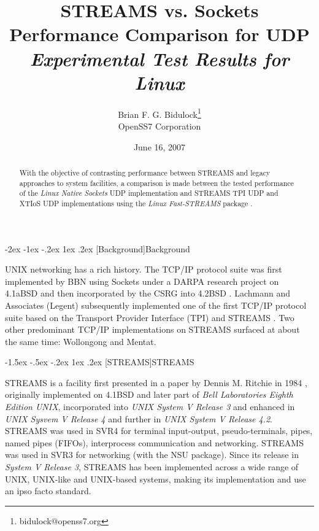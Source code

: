 \documentclass[letterpaper,final,notitlepage,twocolumn,10pt,twoside]{article}
\makeatletter
\renewcommand\section{\@startsection {section}{1}{\z@}%
                                   {-2ex \@plus -1ex \@minus -.2ex}%
                                   {1ex \@plus .2ex}%
                                   {\normalfont\large\bfseries}}
\renewcommand\subsection{\@startsection{subsection}{2}{\z@}%
                                     {-1.5ex \@plus -.5ex \@minus -.2ex}%
                                     {1ex \@plus .2ex}%
                                     {\normalfont\normalsize\bfseries}}
\makeatother
\begin{document}

\title{STREAMS vs. Sockets Performance Comparison for UDP\\[0.5ex]
	{\large \textsl{Experimental Test Results for Linux}}}
\author{Brian F. G. Bidulock\thanks{bidulock@openss7.org}\\
	OpenSS7 Corporation}
\date{June 16, 2007}
\maketitle

\begin{abstract}
With the objective of contrasting performance between STREAMS and legacy approaches to system
facilities, a comparison is made between the tested performance of the \textsl{Linux Native Sockets} UDP
implementation and STREAMS TPI UDP and XTIoS UDP
implementations using the \textsl{Linux Fast-STREAMS} package \cite[]{LfS}.
\end{abstract}


\section[Background]{Background}

UNIX networking has a rich history.  The TCP/IP protocol suite was first implemented by BBN using
Sockets under a DARPA research project on 4.1aBSD and then incorporated by the CSRG into 4.2BSD
\cite[]{bsd}.  Lachmann and Associates (Legent) subsequently implemented one of the first TCP/IP
protocol suite based on the Transport Provider Interface (TPI) \cite[]{tli} and STREAMS
\cite[]{magic}.  Two other predominant TCP/IP implementations on STREAMS surfaced at about the same
time: Wollongong and Mentat.

\subsection[STREAMS]{STREAMS}

STREAMS is a facility first presented in a paper by Dennis M. Ritchie in 1984 \cite[]{Ritchie84},
originally implemented on 4.1BSD and later part of \textsl{Bell Laboratories Eighth Edition UNIX},
incorporated into \textsl{UNIX System V Release 3} and enhanced in \textsl{UNIX Sysvem V Release 4}
and further in \textsl{UNIX System V Release 4.2}.  STREAMS was used in SVR4 for terminal
input-output, pseudo-terminals, pipes, named pipes (FIFOs), interprocess communication and
networking.  STREAMS was used in SVR3 for networking (with the NSU package).  Since its release in
\textsl{System V Release 3}, STREAMS has been implemented across a wide range of UNIX, UNIX-like and
UNIX-based systems, making its implementation and use an ipso facto standard.
\end{document}
